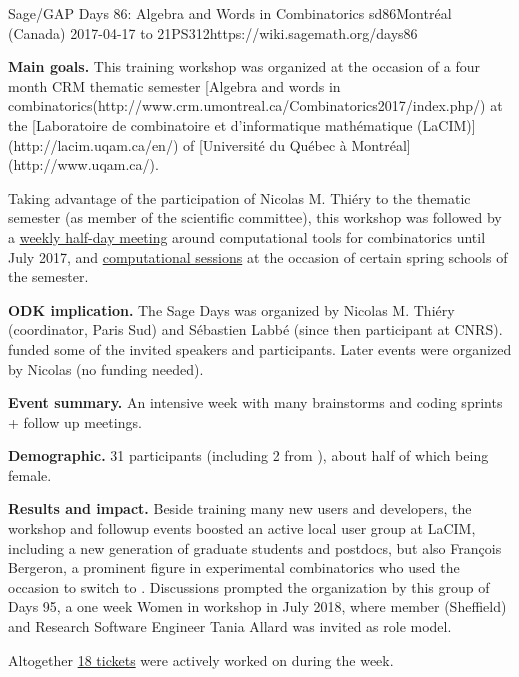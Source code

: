 \begin{event}{Sage/GAP Days 86: Algebra and Words in Combinatorics }{sd86}{Montréal (Canada) 2017-04-17 to 21}{PS}{31}{2}{https://wiki.sagemath.org/days86}

  \textbf{Main goals.} This training workshop was organized at the
  occasion of a four month CRM thematic semester
  [Algebra and words in combinatorics(http://www.crm.umontreal.ca/Combinatorics2017/index.php/)
  at the [Laboratoire de combinatoire et d'informatique mathématique (LaCIM)](http://lacim.uqam.ca/en/) of
  [Université du Québec à Montréal](http://www.uqam.ca/).

  Taking advantage of the participation of Nicolas M. Thiéry to the
  thematic semester (as member of the scientific committee), this
  workshop was followed by a
  \href{https://wiki.sagemath.org/Montreal}{weekly half-day meeting}
  around computational tools for combinatorics until July 2017, and
  \href{https://more-sagemath-tutorials.readthedocs.io/en/latest/2017-05-29-CRM/}{computational
    sessions} at the occasion of certain spring schools of the
  semester.

  \textbf{ODK implication.} The Sage Days was organized by Nicolas M.
  Thiéry (\ODK coordinator, Paris Sud) and Sébastien Labbé (since then
  \ODK participant at CNRS). \ODK funded some of the invited speakers
  and \ODK participants. Later events were organized by Nicolas (no
  funding needed).

  \textbf{Event summary.} An intensive week with many brainstorms and
  coding sprints + follow up meetings.

  \textbf{Demographic.} 31 participants (including 2 from \ODK), about
  half of which being female.

  \textbf{Results and impact.} Beside training many new \Sage users
  and developers, the workshop and followup events boosted an active
  local user group at LaCIM, including a new generation of graduate
  students and postdocs, but also François Bergeron, a prominent
  figure in experimental combinatorics who used the occasion to switch
  to \Sage. Discussions prompted the organization by this group of
  \Sage Days 95, a one week Women in \Sage workshop in July 2018,
  where \ODK member (Sheffield) and Research Software Engineer Tania
  Allard was invited as role model.

  Altogether
  \href{https://trac.sagemath.org/query?status=closed&status=needs_info&status=needs_review&status=needs_work&status=new&status=positive_review&keywords=~days86&col=id&col=summary&col=status&col=time&col=changetime&col=author&col=reviewer&order=status}{18
    \Sage tickets} were actively worked on during the week.
\end{event}
